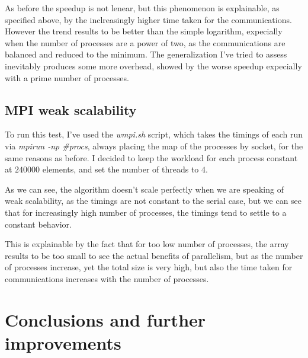 \documentclass{article}
\begin{document}
	
	As before the speedup is not lenear, but this phenomenon is explainable, as specified above, by the inclreasingly higher time taken for the communications. However the trend results to be better than the simple logarithm, expecially when the number of processes are a power of two, as the communications are balanced and reduced to the minimum.
	The generalization I've tried to assess inevitably produces some more overhead, showed by the worse speedup expecially with a prime number of processes.
	
	\subsection{MPI weak scalability}
	
	To run this test, I've used the \textit{wmpi.sh} script, which takes the timings of each run via \textit{mpirun -np \#procs}, always placing the map of the processes by socket, for the same reasons as before. I decided to keep the workload for each process constant at $240000$ elements, and set the number of threads to $4$.
	
	
	As we can see, the algorithm doesn't scale perfectly when we are speaking of weak scalability, as the timings are not constant to the serial case, but we can see that for increasingly high number of processes, the timings tend to settle to a constant behavior.
	
	This is explainable by the fact that for too low number of processes, the array results to be too small to see the actual benefits of parallelism, but as the number of processes increase, yet the total size is very high, but also the time taken for communications increases with the number of processes.
	
	\section{Conclusions and further improvements}
	
\end{document}
